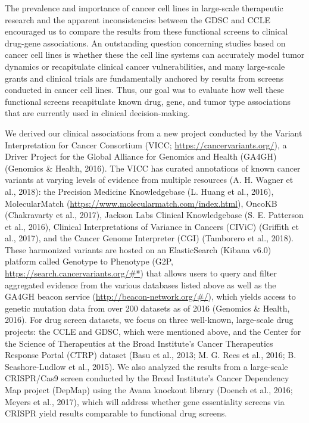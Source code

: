 \documentclass[man]{apa6}
\begin{document}
The prevalence and importance of cancer cell lines in large-scale
therapeutic research and the apparent inconsistencies between the GDSC
and CCLE encouraged us to compare the results from these functional
screens to clinical drug-gene associations. An outstanding question
concerning studies based on cancer cell lines is whether these the cell
line systems can accurately model tumor dynamics or recapitulate
clinical cancer vulnerabilities, and many large-scale grants and
clinical trials are fundamentally anchored by results from screens
conducted in cancer cell lines. Thus, our goal was to evaluate how well
these functional screens recapitulate known drug, gene, and tumor type
associations that are currently used in clinical decision-making.

We derived our clinical associations from a new project conducted by the
Variant Interpretation for Cancer Consortium (VICC;
\url{https://cancervariants.org/}), a Driver Project for the Global
Alliance for Genomics and Health (GA4GH) (Genomics \& Health, 2016). The
VICC has curated annotations of known cancer variants at varying levels
of evidence from multiple resources (A. H. Wagner et al., 2018): the
Precision Medicine Knowledgebase (L. Huang et al., 2016), MolecularMatch
(\url{https://www.molecularmatch.com/index.html}), OncoKB (Chakravarty
et al., 2017), Jackson Labs Clinical Knowledgebase (S. E. Patterson et
al., 2016), Clinical Interpretations of Variance in Cancers (CIViC)
(Griffith et al., 2017), and the Cancer Genome Interpreter (CGI)
(Tamborero et al., 2018). These harmonized variants are hosted on an
ElasticSearch (Kibana v6.0) platform called Genotype to Phenotype (G2P,
\url{https://search.cancervariants.org/\#*}) that allows users to query
and filter aggregated evidence from the various databases listed above
as well as the GA4GH beacon service
(\url{http://beacon-network.org/\#/}), which yields access to genetic
mutation data from over 200 datasets as of 2016 (Genomics \& Health,
2016). For drug screen datasets, we focus on three well-known,
large-scale drug projects: the CCLE and GDSC, which were mentioned
above, and the Center for the Science of Therapeutics at the Broad
Institute's Cancer Therapeutics Response Portal (CTRP) dataset (Basu et
al., 2013; M. G. Rees et al., 2016; B. Seashore-Ludlow et al., 2015). We
also analyzed the results from a large-scale CRISPR/Cas9 screen
conducted by the Broad Institute's Cancer Dependency Map project
(DepMap) using the Avana knockout library (Doench et al., 2016; Meyers
et al., 2017), which will address whether gene essentiality screens via
CRISPR yield results comparable to functional drug screens.
\end{document}
